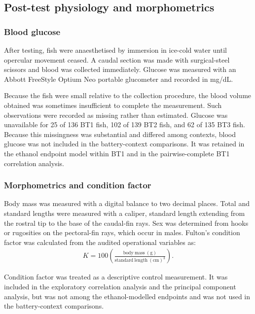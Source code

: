 \documentclass[12pt,a4paper]{article}
\begin{document}
\subsection{Post-test physiology and morphometrics}
\label{sec:physiology}

\subsubsection{Blood glucose}
\label{sec:glucose}
After testing, fish were anaesthetised by immersion in ice-cold water until opercular movement ceased. A caudal section was made with surgical-steel scissors and blood was collected immediately. Glucose was measured with an Abbott FreeStyle Optium Neo portable glucometer and recorded in mg/dL.

Because the fish were small relative to the collection procedure, the blood volume obtained was sometimes insufficient to complete the measurement. Such observations were recorded as missing rather than estimated. Glucose was unavailable for 25 of 136 BT1 fish, 102 of 139 BT2 fish, and 62 of 135 BT3 fish. Because this missingness was substantial and differed among contexts, blood glucose was not included in the battery-context comparisons. It was retained in the ethanol endpoint model within BT1 and in the pairwise-complete BT1 correlation analysis.

\subsubsection{Morphometrics and condition factor}
\label{sec:condition}
Body mass was measured with a digital balance to two decimal places. Total and standard lengths were measured with a caliper, standard length extending from the rostral tip to the base of the caudal-fin rays. Sex was determined from hooks or rugosities on the pectoral-fin rays, which occur in males. Fulton's condition factor was calculated from the audited operational variables as:
\begin{equation}
\label{eq:condition-factor}
\begin{split}
K = 100 \left( \frac{\mathrm{body\ mass\ (g)}}{\mathrm{standard\ length\ (cm)}^{3}} \right).
\end{split}
\end{equation}

Condition factor was treated as a descriptive control measurement. It was included in the exploratory correlation analysis and the principal component analysis, but was not among the ethanol-modelled endpoints and was not used in the battery-context comparisons.
\end{document}
